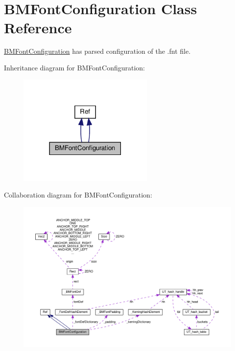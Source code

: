 \hypertarget{classBMFontConfiguration}{}\section{B\+M\+Font\+Configuration Class Reference}
\label{classBMFontConfiguration}


\hyperlink{classBMFontConfiguration}{B\+M\+Font\+Configuration} has parsed configuration of the .fnt file.  




Inheritance diagram for B\+M\+Font\+Configuration\+:
\nopagebreak
\begin{figure}[H]
\begin{center}
\leavevmode
\includegraphics[width=189pt]{classBMFontConfiguration__inherit__graph}
\end{center}
\end{figure}


Collaboration diagram for B\+M\+Font\+Configuration\+:
\nopagebreak
\begin{figure}[H]
\begin{center}
\leavevmode
\includegraphics[width=350pt]{classBMFontConfiguration__coll__graph}
\end{center}
\end{figure}
